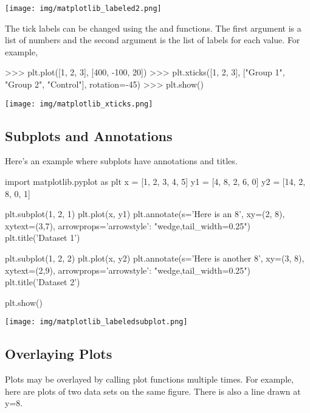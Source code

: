 \documentclass[11pt]{cselabheader}
\begin{document}
\begin{center}
\texttt{[image: img/matplotlib\_labeled2.png]}
\end{center}

The tick labels can be changed using the  and
 functions. The first argument is a list of
numbers and the second argument is the list of labels for each value.
For example,
\begin{pyconcode}
>>> plt.plot([1, 2, 3], [400, -100, 20])
>>> plt.xticks([1, 2, 3], ["Group 1", "Group 2", "Control"], rotation=-45)
>>> plt.show()
\end{pyconcode}

\begin{center}
\texttt{[image: img/matplotlib\_xticks.png]}
\end{center}

\subsection{Subplots and Annotations}

Here's an example where subplots have annotations and titles.

\begin{python3code}
import matplotlib.pyplot as plt
x = [1, 2, 3, 4, 5]
y1 = [4, 8, 2, 6, 0]
y2 = [14, 2, 8, 0, 1]

plt.subplot(1, 2, 1)
plt.plot(x, y1)
plt.annotate(s='Here is an 8', xy=(2, 8), xytext=(3,7),
             arrowprops={'arrowstyle': "wedge,tail_width=0.25"})
plt.title('Dataset 1')

plt.subplot(1, 2, 2)
plt.plot(x, y2)
plt.annotate(s='Here is another 8', xy=(3, 8), xytext=(2,9),
             arrowprops={'arrowstyle': "wedge,tail_width=0.25"})
plt.title('Dataset 2')

plt.show()
\end{python3code}

\begin{center}
\texttt{[image: img/matplotlib\_labeledsubplot.png]}
\end{center}

\subsection{Overlaying Plots}
Plots may be overlayed by calling plot functions multiple times.
For example, here are plots of two data sets on the same figure.
There is also a line drawn at y=8.
\end{document}
